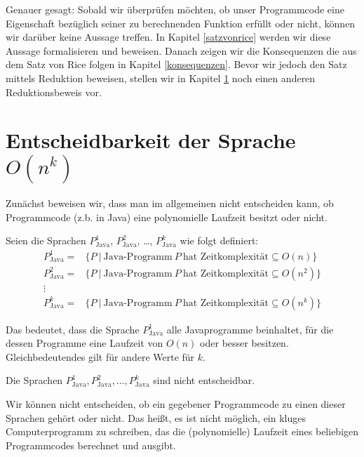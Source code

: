 \documentclass[journal]{IEEEtran}
\begin{document}
Genauer gesagt: Sobald wir überprüfen möchten, ob unser Programmcode eine Eigenschaft bezüglich seiner zu berechnenden Funktion erfüllt oder nicht, können wir darüber keine Aussage treffen. In Kapitel \ref{satzvonrice} werden wir diese Aussage formalisieren und beweisen. Danach zeigen wir die Konsequenzen die aus dem Satz von Rice folgen in Kapitel \ref{konsequenzen}. Bevor wir jedoch den Satz mittels Reduktion beweisen, stellen wir in Kapitel \ref{entscheidbarkeitovonn} noch einen anderen Reduktionsbeweis vor.

\section{Entscheidbarkeit der Sprache $O(n^k)$}
\label{entscheidbarkeitovonn}

Zunächst beweisen wir, dass man im allgemeinen nicht entscheiden kann, ob Programmcode (z.b. in Java) eine polynomielle Laufzeit besitzt oder nicht.

\begin{definition}
Seien die Sprachen $P_\text{Java}^1$, $P_\text{Java}^2$, \dots, $P_\text{Java}^k$ wie folgt definiert:
\begin{align*}
P_\text{Java}^1 =& \{ P \ \vert \ \text{Java-Programm} \  P \ \text{hat Zeitkomplexit\"at} \subseteq O(n) \} \\
P_\text{Java}^2 =& \{ P \ \vert \ \text{Java-Programm} \  P \ \text{hat Zeitkomplexit\"at} \subseteq O(n^2) \} \\
\vdots \\
P_\text{Java}^k =& \{ P \ \vert \ \text{Java-Programm} \  P \ \text{hat Zeitkomplexit\"at} \subseteq O(n^k) \}
\end{align*}
\end{definition}

Das bedeutet, dass die Sprache $P_\text{Java}^1$ alle Javaprogramme beinhaltet, für die dessen Programme eine Laufzeit von $O(n)$ oder besser besitzen. Gleichbedeutendes gilt für andere Werte für $k$.

\begin{theorem}
  Die Sprachen $P_\text{Java}^1, P_\text{Java}^2, \dotsc, P_\text{Java}^k$ sind nicht entscheidbar.
\end{theorem}

Wir können nicht entscheiden, ob ein gegebener Programmcode zu einen dieser Sprachen gehört oder nicht. Das heißt, es ist nicht möglich, ein kluges Computerprogramm zu schreiben, das die (polynomielle) Laufzeit eines beliebigen Programmcodes berechnet und ausgibt.
\end{document}
